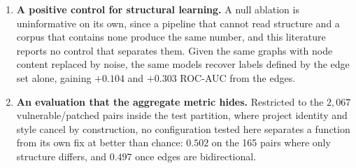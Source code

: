 \begin{enumerate}
    \item \textbf{A positive control for structural learning.} A null ablation
    is uninformative on its own, since a pipeline that cannot read structure
    and a corpus that contains none produce the same number, and this
    literature reports no control that separates them. Given the same graphs
    with node content replaced by noise, the same models recover labels defined
    by the edge set alone, gaining $+0.104$ and $+0.303$ ROC-AUC from the edges.

    \item \textbf{An evaluation that the aggregate metric hides.} Restricted
    to the $2{,}067$ vulnerable/patched pairs inside the test partition, where
    project identity and style cancel by construction, no configuration tested
    here separates a function from its own fix at better than chance: $0.502$
    on the 165 pairs where only structure differs, and $0.497$ once edges are
    bidirectional.
\end{enumerate}
